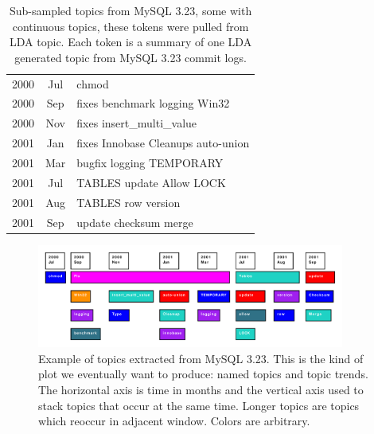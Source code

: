 \documentclass[times, 10pt,twocolumn]{article}
\begin{document}
\begin{table}
\centering
\begin{tabular}{|cc|l|}
\hline
2000 &  Jul &      chmod \\
2000 &  Sep &      fixes benchmark logging Win32 \\
2000 &  Nov &      fixes insert\_multi\_value \\
2001 &  Jan &      fixes Innobase Cleanups auto-union \\
2001 &  Mar &      bugfix logging  TEMPORARY  \\
\hline         
2001 &  Jul &      TABLES update Allow LOCK \\ 
               
2001 &  Aug &      TABLES row version \\
\hline         
2001 &  Sep &      update checksum merge \\
\hline
\end{tabular}
\caption{Sub-sampled topics from MySQL 3.23, some with continuous topics, these tokens were pulled from LDA topic. Each token is a summary of one LDA generated topic from MySQL 3.23 commit logs.}
\label{tab:portability}
\end{table}



\begin{figure}
  \centering
  \includegraphics[width=0.9\textwidth]{lda}
  \caption{Example of topics extracted from MySQL 3.23. This is the kind of plot we eventually want to produce: named topics and topic trends. The horizontal axis is time in months and the vertical axis used to stack topics that occur at the same time. Longer topics are topics which reoccur in adjacent window. Colors are arbitrary.}
  \label{fig:lda}
\end{figure}
\end{document}
